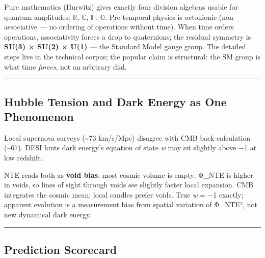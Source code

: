 \documentclass[
  11pt,
]{article}
\begin{document}
Pure mathematics (Hurwitz) gives exactly four division algebras usable
for quantum amplitudes: \(\mathbb{R}\), \(\mathbb{C}\), \(\mathbb{H}\),
\(\mathbb{O}\). Pre-temporal physics is octonionic (non-associative ---
no ordering of operations without time). When time orders operations,
associativity forces a drop to quaternions; the residual symmetry is
\textbf{SU(3) × SU(2) × U(1)} --- the Standard Model gauge group. The
detailed steps live in the technical corpus; the popular claim is
structural: the SM group is what time \emph{forces}, not an arbitrary
dial.

\begin{center}\rule{0.5\linewidth}{0.5pt}\end{center}

\subsection{Hubble Tension and Dark Energy as One
Phenomenon}\label{hubble-tension-and-dark-energy-as-one-phenomenon}

Local supernova surveys (\textasciitilde73 km/s/Mpc) disagree with CMB
back-calculation (\textasciitilde67). DESI hints dark energy's equation
of state \emph{w} may sit slightly above −1 at low redshift.

NTE reads both as \textbf{void bias}: most cosmic volume is empty;
\textbar Φ\_NTE\textbar{} is higher in voids, so lines of sight through
voids see slightly faster local expansion. CMB integrates the cosmic
mean; local candles prefer voids. True \emph{w} = −1 exactly; apparent
evolution is a measurement bias from spatial variation of
\textbar Φ\_NTE\textbar², not new dynamical dark energy.

\begin{center}\rule{0.5\linewidth}{0.5pt}\end{center}

\subsection{Prediction Scorecard}\label{prediction-scorecard}
\end{document}

